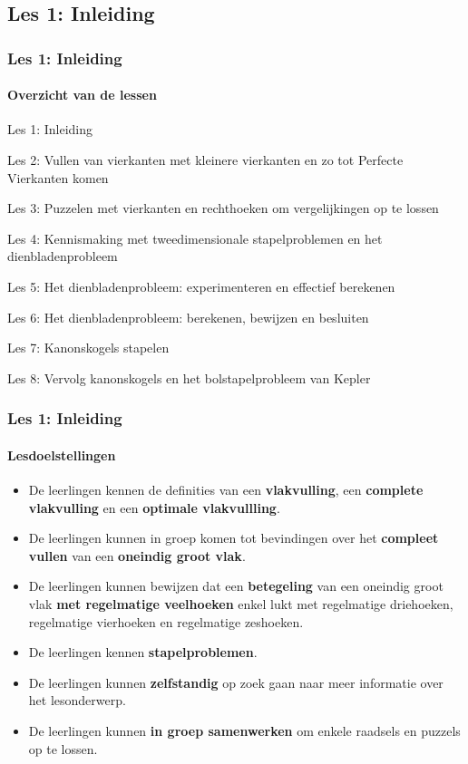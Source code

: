 \documentclass[dutch]{beamer}
\begin{document}
\subsection{Les 1: Inleiding}
\begin{frame}
\frametitle{Les 1: Inleiding}
\framesubtitle{Overzicht van de lessen}
\begin{list}{\quad}{}
\item {\color{blue}Les 1: Inleiding}
\item Les 2: Vullen van vierkanten met kleinere vierkanten en zo tot Perfecte Vierkanten komen
\item Les 3: Puzzelen met vierkanten en rechthoeken om vergelijkingen op te lossen
\item Les 4: Kennismaking met tweedimensionale stapelproblemen en het dienbladenprobleem 
\item Les 5: Het dienbladenprobleem: experimenteren en effectief berekenen
\item Les 6: Het dienbladenprobleem: berekenen, bewijzen en besluiten
\item Les 7: Kanonskogels stapelen
\item Les 8: Vervolg kanonskogels en het bolstapelprobleem van Kepler
\end{list}
\end{frame}

\begin{frame}
\frametitle{Les 1: Inleiding}
\framesubtitle{Lesdoelstellingen}
\begin{itemize}
\item De leerlingen kennen de definities van een \textbf{vlakvulling}, een \textbf{complete vlakvulling} en een \textbf{optimale vlakvullling}.
\item De leerlingen kunnen in groep komen tot bevindingen over het \textbf{compleet vullen} van een \textbf{oneindig groot vlak}.
\item De leerlingen kunnen bewijzen dat een \textbf{betegeling} van een oneindig groot vlak \textbf{met regelmatige veelhoeken} enkel lukt met regelmatige driehoeken, regelmatige vierhoeken en regelmatige zeshoeken.
\item De leerlingen kennen \textbf{stapelproblemen}.
\item De leerlingen kunnen \textbf{zelfstandig} op zoek gaan naar meer informatie over het lesonderwerp.
\item De leerlingen kunnen \textbf{in groep samenwerken} om enkele raadsels en puzzels op te lossen.
\end{itemize}
\end{frame}
\end{document}
